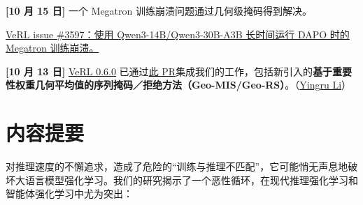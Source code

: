 
\textbf{[10 月 15 日]} 一个 Megatron 训练崩溃问题通过几何级掩码得到解决。



\href{https://github.com/volcengine/verl/issues/3597}{VeRL issue \#3597：使用 Qwen3-14B/Qwen3-30B-A3B 长时间运行 DAPO 时的 Megatron 训练崩溃。}



\textbf{[10 月 13 日]} \href{https://github.com/volcengine/verl/releases/tag/v0.6.0}{VeRL 0.6.0} 已通过\href{https://github.com/volcengine/verl/pull/3694}{此 PR}集成我们的工作，包括新引入的\textbf{基于重要性权重几何平均值的序列掩码／拒绝方法（Geo-MIS/Geo-RS）}。（\href{https://richardli.xyz/}{Yingru Li}）




\hypertarget{src-271211a5-58b7-808c-8d7b-caebe4c40799}{}
\section*{内容提要}
{}



对推理速度的不懈追求，造成了危险的“训练与推理不匹配”，它可能悄无声息地破坏大语言模型强化学习。我们的研究揭示了一个恶性循环，在现代推理强化学习和智能体强化学习中尤为突出：



